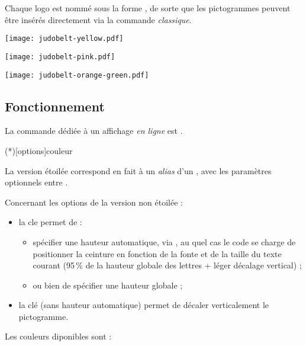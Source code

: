 \documentclass[french,11pt,a4paper]{article}
\begin{document}
Chaque logo est nommé sous la forme , de sorte que les pictogrammes peuvent être insérés directement via la commande  \textit{classique}.

\begin{demohigh}[language=latex/latex3,style/main=cyan!10,style/code=cyan!10,style/demo=cyan!10]
\texttt{[image: judobelt-yellow.pdf]}\par
\texttt{[image: judobelt-pink.pdf]}\par
\texttt{[image: judobelt-orange-green.pdf]}
\end{demohigh}

\subsection{Fonctionnement}

La commande dédiée à un affichage \textit{en ligne} est .

\begin{codehigh}[language=latex/latex2,style/main=cyan!10,style/code=cyan!10]
\CeintureCouleur(*)[options]{couleur}
\end{codehigh}

La version étoilée correspond en fait à un \textit{alias} d'un , avec les paramètres optionnels entre \MontreCode{[...]}.

\medskip

Concernant les options de la version non étoilée :

\begin{itemize}[leftmargin=*]
	\item la cle  permet de :
	\begin{itemize}
		\item spécifier une hauteur automatique, via , au quel cas le code se charge de positionner la ceinture en fonction de la fonte et de la taille du texte courant (95\,\% de la hauteur globale des lettres + léger décalage vertical) ;
		\item ou bien de spécifier une hauteur globale ;
	\end{itemize}
	\item la clé  (sans hauteur automatique) permet de décaler verticalement le pictogramme.
\end{itemize}

Les couleurs diponibles sont :
\end{document}
